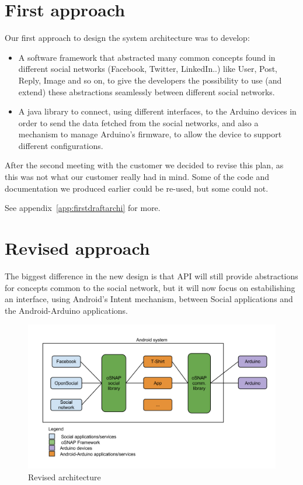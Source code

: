 \section{First approach}

Our first approach to design the system architecture was to develop:

\begin{itemize}
\item A software framework that
abstracted many common concepts found in different social networks (Facebook, Twitter, LinkedIn..)
like User, Post, Reply, Image and so on, to give the developers the possibility to use
(and extend) these abstractions seamlessly between different social networks.

\item A java library to connect, using different interfaces, to the Arduino devices in order
to send the data fetched from the social networks, and also a mechanism to manage Arduino's firmware,
to allow the device to support different configurations.
\end{itemize}

After the second meeting with the customer we decided to revise this plan, as this was not what
our customer really had in mind. Some of the code and documentation we produced earlier could be re-used, but some could not.

See appendix~\ref{app:firstdraftarchi} for more.

\newpage

\section{Revised approach}
The biggest difference in the new design is that API will still provide abstractions
for concepts common to the social network, but it will now focus on estabilishing an interface,
using Android's Intent mechanism, between Social applications and the Android-Arduino applications.

\begin{figure}[h!]
\centering \includegraphics[scale=0.35]{img/architecture-toplevel.png}
\caption{Revised architecture}
\label{fig:architecture}
\end{figure}

